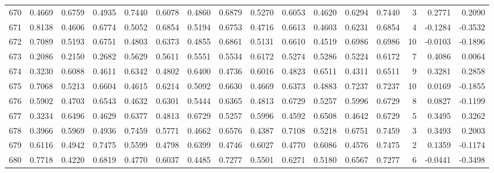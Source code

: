 \begin{tabular}{lrrrrrrrrrrrrrrr}
670 &      0.4669 &  0.6759 &  0.4935 &  0.7440 &  0.6078 &  0.4860 &  0.6879 &  0.5270 &  0.6053 &  0.4620 &   0.6294 &     0.7440 &      3 &                    0.2771 &                     0.2090 \\
671 &      0.8138 &  0.4606 &  0.6774 &  0.5052 &  0.6854 &  0.5194 &  0.6753 &  0.4716 &  0.6613 &  0.4603 &   0.6231 &     0.6854 &      4 &                   -0.1284 &                    -0.3532 \\
672 &      0.7089 &  0.5193 &  0.6751 &  0.4803 &  0.6373 &  0.4855 &  0.6861 &  0.5131 &  0.6610 &  0.4519 &   0.6986 &     0.6986 &     10 &                   -0.0103 &                    -0.1896 \\
673 &      0.2086 &  0.2150 &  0.2682 &  0.5629 &  0.5611 &  0.5551 &  0.5534 &  0.6172 &  0.5274 &  0.5286 &   0.5224 &     0.6172 &      7 &                    0.4086 &                     0.0064 \\
674 &      0.3230 &  0.6088 &  0.4611 &  0.6342 &  0.4802 &  0.6400 &  0.4736 &  0.6016 &  0.4823 &  0.6511 &   0.4311 &     0.6511 &      9 &                    0.3281 &                     0.2858 \\
675 &      0.7068 &  0.5213 &  0.6604 &  0.4615 &  0.6214 &  0.5092 &  0.6630 &  0.4669 &  0.6373 &  0.4883 &   0.7237 &     0.7237 &     10 &                    0.0169 &                    -0.1855 \\
676 &      0.5902 &  0.4703 &  0.6543 &  0.4632 &  0.6301 &  0.5444 &  0.6365 &  0.4813 &  0.6729 &  0.5257 &   0.5996 &     0.6729 &      8 &                    0.0827 &                    -0.1199 \\
677 &      0.3234 &  0.6496 &  0.4629 &  0.6377 &  0.4813 &  0.6729 &  0.5257 &  0.5996 &  0.4592 &  0.6508 &   0.4642 &     0.6729 &      5 &                    0.3495 &                     0.3262 \\
678 &      0.3966 &  0.5969 &  0.4936 &  0.7459 &  0.5771 &  0.4662 &  0.6576 &  0.4387 &  0.7108 &  0.5218 &   0.6751 &     0.7459 &      3 &                    0.3493 &                     0.2003 \\
679 &      0.6116 &  0.4942 &  0.7475 &  0.5599 &  0.4798 &  0.6399 &  0.4746 &  0.6027 &  0.4770 &  0.6086 &   0.4576 &     0.7475 &      2 &                    0.1359 &                    -0.1174 \\
680 &      0.7718 &  0.4220 &  0.6819 &  0.4770 &  0.6037 &  0.4485 &  0.7277 &  0.5501 &  0.6271 &  0.5180 &   0.6567 &     0.7277 &      6 &                   -0.0441 &                    -0.3498 \\

\end{tabular}

